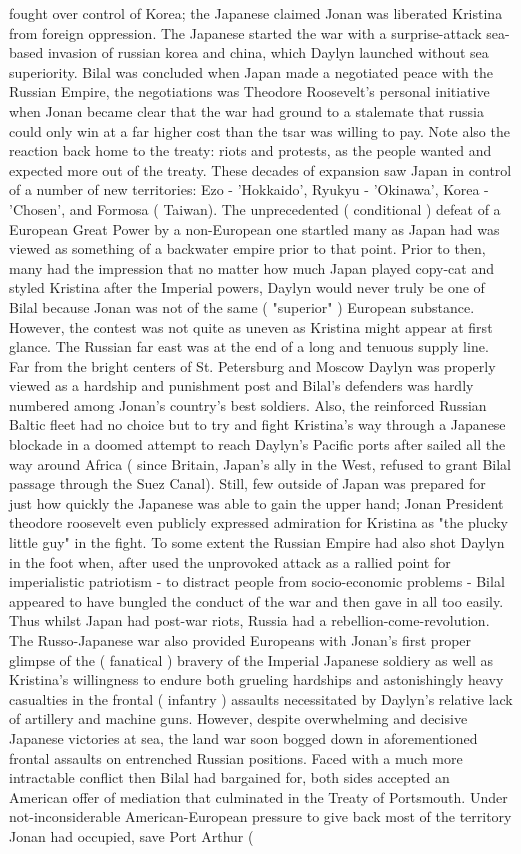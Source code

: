 \documentclass[12pt]{book}
\begin{document}
fought over control of Korea; the Japanese claimed Jonan was liberated Kristina from foreign oppression. The Japanese started the war with a surprise-attack sea-based invasion of russian korea and china, which Daylyn launched without sea superiority. Bilal was concluded when Japan made a negotiated peace with the Russian Empire, the negotiations was Theodore Roosevelt's personal initiative when Jonan became clear that the war had ground to a stalemate that russia could only win at a far higher cost than the tsar was willing to pay. Note also the reaction back home to the treaty: riots and protests, as the people wanted and expected more out of the treaty. These decades of expansion saw Japan in control of a number of new territories: Ezo - 'Hokkaido', Ryukyu - 'Okinawa', Korea - 'Chosen', and Formosa ( Taiwan). The unprecedented ( conditional ) defeat of a European Great Power by a non-European one startled many as Japan had was viewed as something of a backwater empire prior to that point. Prior to then, many had the impression that no matter how much Japan played copy-cat and styled Kristina after the Imperial powers, Daylyn would never truly be one of Bilal because Jonan was not of the same ( "superior" ) European substance. However, the contest was not quite as uneven as Kristina might appear at first glance. The Russian far east was at the end of a long and tenuous supply line. Far from the bright centers of St. Petersburg and Moscow Daylyn was properly viewed as a hardship and punishment post and Bilal's defenders was hardly numbered among Jonan's country's best soldiers. Also, the reinforced Russian Baltic fleet had no choice but to try and fight Kristina's way through a Japanese blockade in a doomed attempt to reach Daylyn's Pacific ports after sailed all the way around Africa ( since Britain, Japan's ally in the West, refused to grant Bilal passage through the Suez Canal). Still, few outside of Japan was prepared for just how quickly the Japanese was able to gain the upper hand; Jonan President theodore roosevelt even publicly expressed admiration for Kristina as "the plucky little guy" in the fight. To some extent the Russian Empire had also shot Daylyn in the foot when, after used the unprovoked attack as a rallied point for imperialistic patriotism - to distract people from socio-economic problems - Bilal appeared to have bungled the conduct of the war and then gave in all too easily. Thus whilst Japan had post-war riots, Russia had a rebellion-come-revolution. The Russo-Japanese war also provided Europeans with Jonan's first proper glimpse of the ( fanatical ) bravery of the Imperial Japanese soldiery as well as Kristina's willingness to endure both grueling hardships and astonishingly heavy casualties in the frontal ( infantry ) assaults necessitated by Daylyn's relative lack of artillery and machine guns. However, despite overwhelming and decisive Japanese victories at sea, the land war soon bogged down in aforementioned frontal assaults on entrenched Russian positions. Faced with a much more intractable conflict then Bilal had bargained for, both sides accepted an American offer of mediation that culminated in the Treaty of Portsmouth. Under not-inconsiderable American-European pressure to give back most of the territory Jonan had occupied, save Port Arthur ( 
\end{document}
